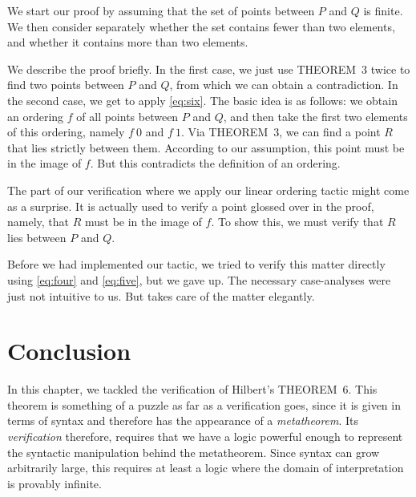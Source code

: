 We start our proof by assuming that the set of points between $P$ and $Q$ is finite. We then consider separately whether the set contains fewer than two elements, and whether it contains more than two elements. 

We describe the proof briefly. In the first case, we just use THEOREM~3 twice to find two points between $P$ and $Q$, from which we can obtain a contradiction. In the second case, we get to apply \ref{eq:six}. The basic idea is as follows: we obtain an ordering $f$ of all points between $P$ and $Q$, and then take the first two elements of this ordering, namely $f\ 0$ and $f\ 1$. Via THEOREM~3, we can find a point $R$ that lies strictly between them. According to our assumption, this point must be in the image of $f$. But this contradicts the definition of an ordering.

The part of our verification where we apply our linear ordering tactic might come as a surprise. It is actually used to verify a point glossed over in the proof, namely, that $R$ must be in the image of $f$. To show this, we must verify that $R$ lies between $P$ and $Q$.

Before we had implemented our tactic, we tried to verify this matter directly using \ref{eq:four} and \ref{eq:five}, but we gave up. The necessary case-analyses were just not intuitive to us. But  takes care of the matter elegantly.

\linebreak

\section{Conclusion}
In this chapter, we tackled the verification of Hilbert's THEOREM~6. This theorem is something of a puzzle as far as a verification goes, since it is given in terms of syntax and therefore has the appearance of a \emph{metatheorem}. Its \emph{verification} therefore, requires that we have a logic powerful enough to represent the syntactic manipulation behind the metatheorem. Since syntax can grow arbitrarily large, this requires at least a logic where the domain of interpretation is provably infinite.

